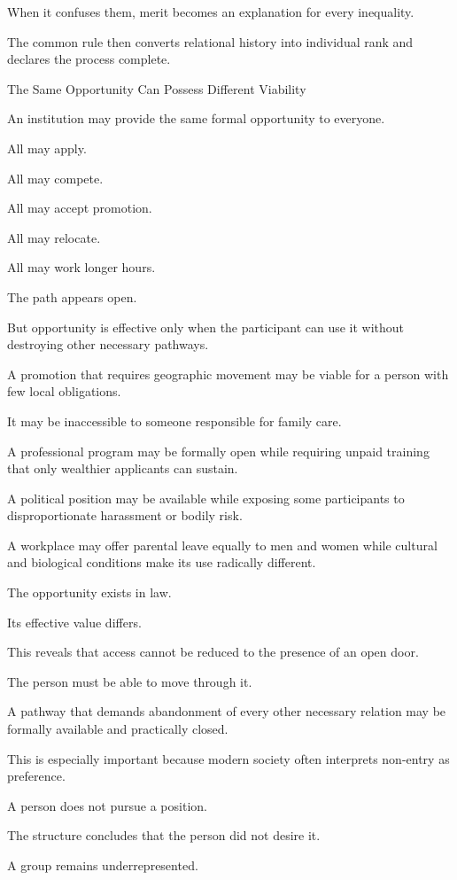 When it confuses them, merit becomes an explanation for every inequality.

The common rule then converts relational history into individual rank and declares the process complete.

The Same Opportunity Can Possess Different Viability

An institution may provide the same formal opportunity to everyone.

All may apply.

All may compete.

All may accept promotion.

All may relocate.

All may work longer hours.

The path appears open.

But opportunity is effective only when the participant can use it without destroying other necessary pathways.

A promotion that requires geographic movement may be viable for a person with few local obligations.

It may be inaccessible to someone responsible for family care.

A professional program may be formally open while requiring unpaid training that only wealthier applicants can sustain.

A political position may be available while exposing some participants to disproportionate harassment or bodily risk.

A workplace may offer parental leave equally to men and women while cultural and biological conditions make its use radically different.

The opportunity exists in law.

Its effective value differs.

This reveals that access cannot be reduced to the presence of an open door.

The person must be able to move through it.

A pathway that demands abandonment of every other necessary relation may be formally available and practically closed.

This is especially important because modern society often interprets non-entry as preference.

A person does not pursue a position.

The structure concludes that the person did not desire it.

A group remains underrepresented.

